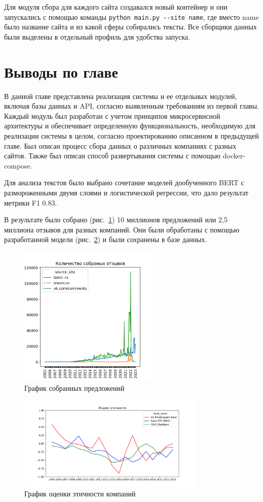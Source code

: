 \documentclass[PI, VKR]{HSEUniversity}
\begin{document}
Для модуля сбора для каждого сайта создавался новый контейнер и они запускались с помощью команды \texttt{python main.py -{}-site name}, где вместо name было название сайта и из какой сферы собирались тексты. Все сборщики данных были выделены в отдельный профиль для удобства запуска.
\section{Выводы по главе}
\label{sec:org3df3e74}
В данной главе представлена реализация системы и ее отдельных модулей, включая базы данных и API, согласно выявленным требованиям из первой главы. Каждый модуль был разработан с учетом принципов микросервисной архитектуры и обеспечивает определенную функциональность, необходимую для реализации системы в целом, согласно проектированию описанном в предыдущей главе. Был описан процесс сбора данных о различных компаниях с разных сайтов. Также был описан способ развертывания системы с помощью docker-compose.

Для анализа текстов было выбрано сочетание моделей дообученного BERT с размороженными двумя слоями и логистической регрессии, что дало результат метрики F1 0.83.

В результате было собрано (рис.~\ref{fig:collected_data}) 10 миллионов предложений или 2,5 миллиона отзывов для разных компаний. Они были обработаны с помощью разработанной модели (рис.~\ref{fig:ethics_analisys}) и были сохранены в базе данных.

\begin{figure}[h!]
\centering
\includegraphics[width=0.6\textwidth]{img/reviews_count.png}
\caption{\label{fig:collected_data}График собранных предложений}
\end{figure}

\begin{figure}[h!]
\centering
\includegraphics[width=0.8\textwidth]{img/ethics_plot_index_safe.png}
\caption{\label{fig:ethics_analisys}График оценки этичности компаний}
\end{figure}
\end{document}
